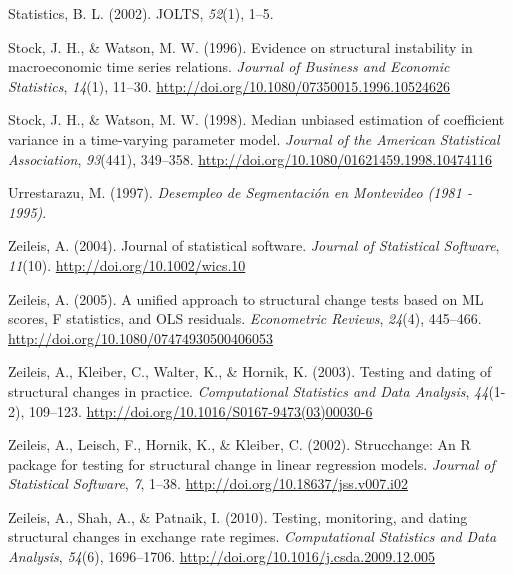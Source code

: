 \documentclass[12pt,oneside]{reedthesis}
\begin{document}
\leavevmode\hypertarget{ref-JOLTS}{}%
Statistics, B. L. (2002). JOLTS, \emph{52}(1), 1--5.

\leavevmode\hypertarget{ref-Stock1996}{}%
Stock, J. H., \& Watson, M. W. (1996). Evidence on structural instability in macroeconomic time series relations. \emph{Journal of Business and Economic Statistics}, \emph{14}(1), 11--30. \url{http://doi.org/10.1080/07350015.1996.10524626}

\leavevmode\hypertarget{ref-Stock1998}{}%
Stock, J. H., \& Watson, M. W. (1998). Median unbiased estimation of coefficient variance in a time-varying parameter model. \emph{Journal of the American Statistical Association}, \emph{93}(441), 349--358. \url{http://doi.org/10.1080/01621459.1998.10474116}

\leavevmode\hypertarget{ref-Urrestarazu1997}{}%
Urrestarazu, M. (1997). \emph{Desempleo de Segmentación en Montevideo (1981 - 1995)}.

\leavevmode\hypertarget{ref-Zeileis2004}{}%
Zeileis, A. (2004). Journal of statistical software. \emph{Journal of Statistical Software}, \emph{11}(10). \url{http://doi.org/10.1002/wics.10}

\leavevmode\hypertarget{ref-Zeileis2005}{}%
Zeileis, A. (2005). A unified approach to structural change tests based on ML scores, F statistics, and OLS residuals. \emph{Econometric Reviews}, \emph{24}(4), 445--466. \url{http://doi.org/10.1080/07474930500406053}

\leavevmode\hypertarget{ref-Zeileis2003}{}%
Zeileis, A., Kleiber, C., Walter, K., \& Hornik, K. (2003). Testing and dating of structural changes in practice. \emph{Computational Statistics and Data Analysis}, \emph{44}(1-2), 109--123. \url{http://doi.org/10.1016/S0167-9473(03)00030-6}

\leavevmode\hypertarget{ref-Zeileis2002}{}%
Zeileis, A., Leisch, F., Hornik, K., \& Kleiber, C. (2002). Strucchange: An R package for testing for structural change in linear regression models. \emph{Journal of Statistical Software}, \emph{7}, 1--38. \url{http://doi.org/10.18637/jss.v007.i02}

\leavevmode\hypertarget{ref-Zeileis2010}{}%
Zeileis, A., Shah, A., \& Patnaik, I. (2010). Testing, monitoring, and dating structural changes in exchange rate regimes. \emph{Computational Statistics and Data Analysis}, \emph{54}(6), 1696--1706. \url{http://doi.org/10.1016/j.csda.2009.12.005}


\end{document}
